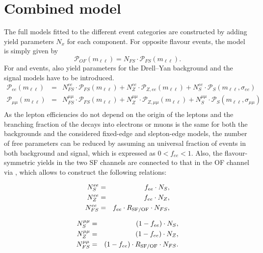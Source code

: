 \section{Combined model}
\label{sec:fullModel}
The full models fitted to the different event categories are constructed by adding yield parameters $N_x$ for each component. For opposite flavour events, the model is simply given by 
\begin{equation*}
 \mathcal{P}_{OF}(m_{\ell\ell}) = N_{FS} \cdot \mathcal{P}_{FS}(m_{\ell\ell}).
\end{equation*}
For \EE and \MM events, also yield parameters for the Drell--Yan background and the signal models have to be introduced. 
\begin{eqnarray*}
 {\mathcal{P}}_{ee}(m_{\ell\ell})     & = &  N_{FS}^{ee} \cdot {\mathcal{P}}_{FS}(m_{\ell\ell})      +  N_{Z}^{ee} \cdot {\mathcal{P}}_{Z,ee}(m_{\ell\ell})           +   N_{S}^{ee} \cdot  {\mathcal{P}}_{S}(m_{\ell\ell},\sigma_{ee}) \\
 {\mathcal{P}}_{\mu\mu}(m_{\ell\ell}) & = &   N_{FS}^{\mu\mu} \cdot {\mathcal{P}}_{FS}(m_{\ell\ell})  +  N_{Z}^{\mu\mu} \cdot {\mathcal{P}}_{Z,\mu\mu}(m_{\ell\ell})   +   N_{S}^{\mu\mu} \cdot {\mathcal{P}}_{S}(m_{\ell\ell},\sigma_{\mu\mu}) \\
\end{eqnarray*}
As the lepton efficiencies do not depend on the origin of the leptons and the branching fraction of the decays into electrons or muons is the same for both the backgrounds and the considered fixed-edge and slepton-edge models, the number of free parameters can be reduced by assuming an universal fraction of \EE events in both background and signal, which is expressed as $0 < f_{ee} < 1$. Also, the flavour-symmetric yields in the two SF channels are connected to that in the OF channel via \Rsfof, which allows to construct the following relations:
\begin{center}
  \begin{minipage}[t]{0.49\textwidth}
\begin{eqnarray*}
 N_{S}^{ee} &=& f_{ee} \cdot N_{S}, \\
  N_{Z}^{ee} &=& f_{ee} \cdot N_{Z},\\
    N_{FS}^{ee} &=& f_{ee} \cdot R_{\text{SF/OF}} \cdot N_{FS}, \\
\end{eqnarray*}
  \end{minipage}
  \begin{minipage}[t]{0.49\textwidth}
\begin{eqnarray*}
 N_{S}^{\mu\mu} &=& (1-f_{ee}) \cdot N_{S}, \\
  N_{Z}^{\mu\mu} &=& (1-f_{ee}) \cdot N_{Z}, \\
    N_{FS}^{\mu\mu} &=& (1-f_{ee}) \cdot R_{\text{SF/OF}} \cdot N_{FS}. \\
\end{eqnarray*}
  \end{minipage}
\end{center}
